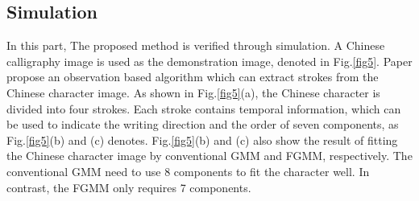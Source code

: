 \documentclass[conference]{IEEEtran}
\begin{document}
\subsection{Simulation}
In this part, The proposed method is verified through simulation. A Chinese calligraphy image is used as the demonstration image, denoted in Fig.\ref{fig5}. Paper \cite{Li2022} propose an observation based algorithm which can extract strokes from the Chinese character image. As shown in Fig.\ref{fig5}(a), the Chinese character is divided into four strokes. Each stroke contains temporal information, which can be used to indicate the writing direction and the order of seven components, as Fig.\ref{fig5}(b) and (c) denotes. Fig.\ref{fig5}(b) and (c) also show the result of fitting the Chinese character image by conventional GMM and FGMM, respectively. The conventional GMM need to use 8 components to fit the character well. In contrast, the FGMM only requires 7 components.
\end{document}
